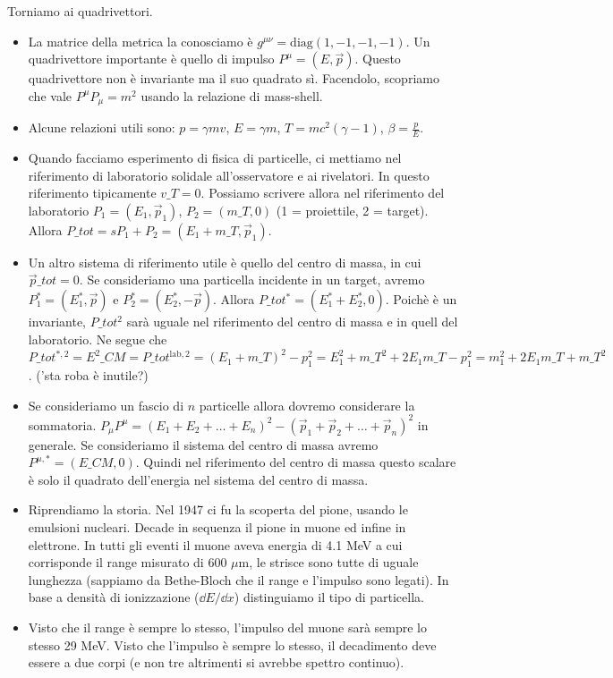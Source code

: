     Torniamo ai quadrivettori. 
    \begin{itemize}
    \item La matrice della metrica la conosciamo è $g^{\mu\nu}=\text{diag}(1,-1,-1,-1)$. Un quadrivettore importante è quello di impulso $P^\mu=(E,\vec p)$. Questo quadrivettore non è invariante ma il suo quadrato sì. Facendolo, scopriamo che vale $P^\mu P_\mu=m^2$ usando la relazione di mass-shell.
    \item Alcune relazioni utili sono: $p=\gamma mv$, $E=\gamma m$, $T=mc^2(\gamma-1)$, $\beta=\frac p E$.
    \item Quando facciamo esperimento di fisica di particelle, ci mettiamo nel riferimento di laboratorio solidale all'osservatore e ai rivelatori. In questo riferimento tipicamente $v\_T=0$. Possiamo scrivere allora nel riferimento del laboratorio $P_1=(E_1,\vec {p}_1)$, $P_2 = (m\_T,0)$ (1 = proiettile, 2 = target). Allora $P\_{tot}=sP_1+P_2=(E_1+m\_T,\vec p_1)$. 
    \item Un altro sistema di riferimento utile è quello del centro di massa, in cui $\vec {p}\_{tot}=0$. Se consideriamo una particella incidente in un target, avremo $P_1^*=(E_1^*,\vec p)$ e $P_2^*=(E_2^*,-\vec p)$. Allora $P\_{tot}^*=(E_1^*+E_2^*,0)$. Poichè è un invariante, $P\_{tot}^2$ sarà uguale nel riferimento del centro di massa e in quell del laboratorio. Ne segue che $P\_{tot}^{*,2}=E^2\_{CM}=P\_{tot}^{\text{lab},2}=(E_1+m\_T)^2-p_1^2=E_1^2+m\_T^2+2E_1m\_T-p_1^2=m_1^2+2E_1m\_T+m\_T^2$. ('sta roba è inutile?)
    \item Se consideriamo un fascio di $n$ particelle allora dovremo considerare la sommatoria. $P_\mu P^\mu= (E_1+E_2+\dots+E_n)^2-(\vec p_1+\vec p_2+\dots+\vec p_n)^2$ in generale. Se consideriamo il sistema del centro di massa avremo $P^{\mu,*}=(E\_{CM},0)$. Quindi nel riferimento del centro di massa questo scalare è solo il quadrato dell'energia nel sistema del centro di massa.
    \item Riprendiamo la storia. Nel 1947 ci fu la scoperta del pione, usando le emulsioni nucleari. Decade in sequenza il pione in muone ed infine in elettrone. In tutti gli eventi il muone aveva energia di 4.1 MeV a cui corrisponde il range misurato di 600 $\mu$m, le strisce sono tutte di uguale lunghezza (sappiamo da Bethe-Bloch che il range e l'impulso sono legati). In base a densità di ionizzazione ($\dd{E}/\dd{x}$) distinguiamo il tipo di particella.
    \item Visto che il range è sempre lo stesso, l'impulso del muone sarà sempre lo stesso 29 MeV. Visto che l'impulso è sempre lo stesso, il decadimento deve essere a due corpi (e non tre altrimenti si avrebbe spettro continuo). 

\end{itemize}
